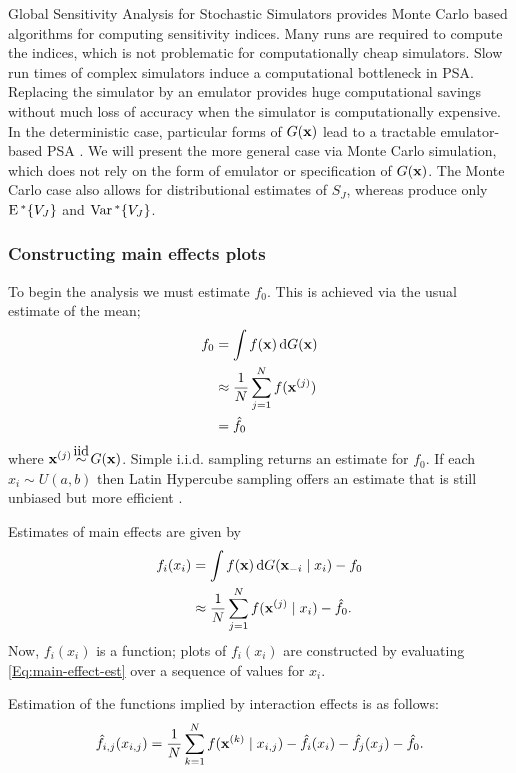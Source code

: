 \begin{chapter}{Global Sensitivity Analysis for Stochastic Simulators\label{Ch:sensitivity}}
\citet{Sobol1993} provides Monte Carlo based algorithms for computing sensitivity indices. Many runs are required to compute the indices, which is not problematic for computationally cheap simulators. Slow run times of complex simulators induce a computational bottleneck in PSA. Replacing the simulator by an emulator provides huge computational savings without much loss of accuracy when the simulator is computationally expensive. In the deterministic case, particular forms of $G(\mathbf{x})$ lead to a tractable emulator-based PSA \citep{Oakley04}. We will present the more general case via Monte Carlo simulation, which does not rely on the form of emulator or specification of $G(\mathbf{x})$. The Monte Carlo case also allows for distributional estimates of $S_J$, whereas \citet{Oakley04} produce only $\textrm{E}\,^{*}\{V_J\}$ and $\mathrm{Var}\,^{*}\{V_J\}$.
\subsubsection{Constructing main effects plots}
To begin the analysis we must estimate $f_0$. This is achieved via the usual estimate of the mean;
\begin{align}
f_0 & = \int f(\mathbf{x}) \,\text{d} G(\mathbf{x}) \\
& \approx \frac{1}{N} \sum_{j = 1}^N f (\mathbf{x}^{(j)}) \\
& =  \hat{f}_0
\end{align}
where $\bx^{(j)} \iid G(\bx)$. Simple i.i.d. sampling returns an  estimate for $f_0$. If each $x_i \sim U(a, b)$ then Latin Hypercube sampling offers an estimate that is still unbiased but more efficient \citep{Mckay1979, Stein1987}.

Estimates of main effects are given by
\begin{align}
f_i(x_i) &  = \int f(\mathbf{x}) \,\text{d} G(\mathbf{x}_{-i} \mid x_i ) - f_0\\
	& \approx \frac{1}{N} \sum_{j = 1}^N f(\mathbf{x}^{(j)} \mid x_i)  - \hat{f}_0. \label{Eq:main-effect-est}
\end{align}
Now, $f_i(x_i)$ is a function; plots of $f_i(x_i)$ are constructed by evaluating \cref{Eq:main-effect-est} over a sequence of values for $x_i$.

Estimation of the functions implied by interaction effects is as follows:
\begin{equation}
\hat{f}_{i,j}(x_{i,j}) = \frac{1}{N} \sum_{k = 1}^N f(\mathbf{x}^{(k)} \mid x_{i,j})  - \hat{f}_i(x_i) - \hat{f}_j(x_j) - \hat{f}_0. \label{Eq:interaction-plot-est}
\end{equation}


\end{chapter}
